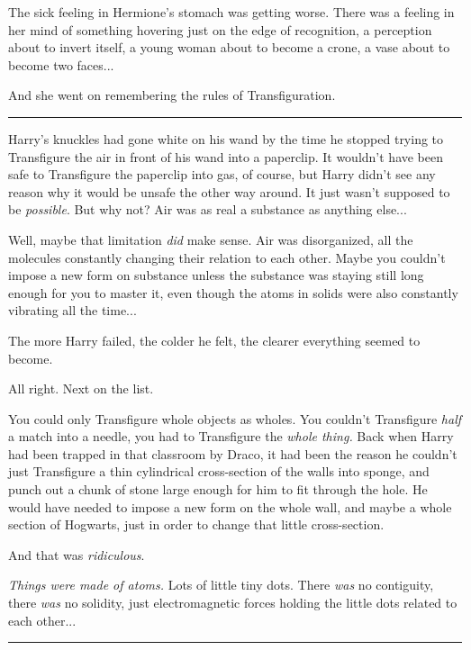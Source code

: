 The sick feeling in Hermione's stomach was getting worse. There was a feeling in her mind of something hovering just on the edge of recognition, a perception about to invert itself, a young woman about to become a crone, a vase about to become two faces...

And she went on remembering the rules of Transfiguration.

\begin{center}\rule{3in}{0.4pt}\end{center}

Harry's knuckles had gone white on his wand by the time he stopped trying to Transfigure the air in front of his wand into a paperclip. It wouldn't have been safe to Transfigure the paperclip into gas, of course, but Harry didn't see any reason why it would be unsafe the other way around. It just wasn't supposed to be \emph{possible}. But why not? Air was as real a substance as anything else...

Well, maybe that limitation \emph{did} make sense. Air was disorganized, all the molecules constantly changing their relation to each other. Maybe you couldn't impose a new form on substance unless the substance was staying still long enough for you to master it, even though the atoms in solids were also constantly vibrating all the time...

The more Harry failed, the colder he felt, the clearer everything seemed to become.

All right. Next on the list.

You could only Transfigure whole objects as wholes. You couldn't Transfigure \emph{half} a match into a needle, you had to Transfigure the \emph{whole thing.} Back when Harry had been trapped in that classroom by Draco, it had been the reason he couldn't just Transfigure a thin cylindrical cross-section of the walls into sponge, and punch out a chunk of stone large enough for him to fit through the hole. He would have needed to impose a new form on the whole wall, and maybe a whole section of Hogwarts, just in order to change that little cross-section.

And that was \emph{ridiculous}.

\emph{Things were made of atoms.} Lots of little tiny dots. There \emph{was} no contiguity, there \emph{was} no solidity, just electromagnetic forces holding the little dots related to each other...

\begin{center}\rule{3in}{0.4pt}\end{center}

